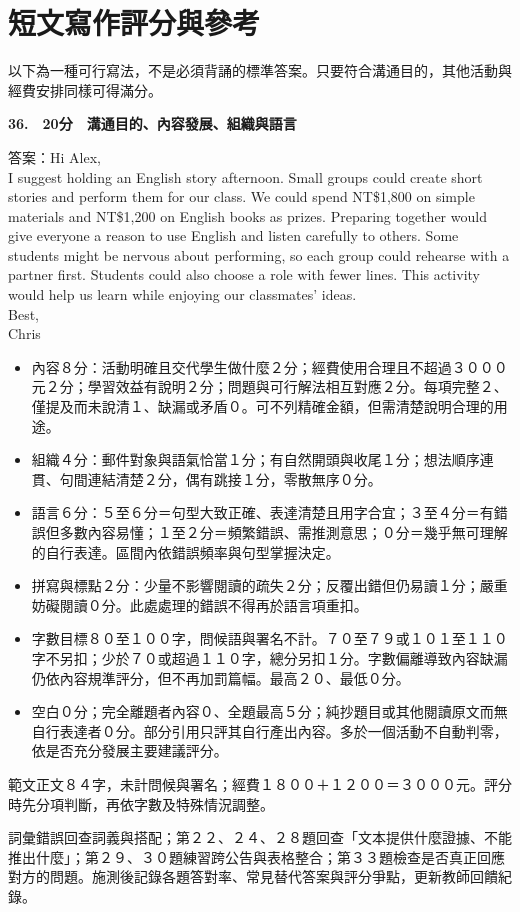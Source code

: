 \documentclass[11pt,a4paper]{article}
\newcommand{\smallheading}[1]{\par\vspace{6pt}{\large\bfseries #1}\par\smallskip}
\begin{document}
\newpage
\section*{短文寫作評分與參考}
以下為一種可行寫法，不是必須背誦的標準答案。只要符合溝通目的，其他活動與經費安排同樣可得滿分。
\par\smallskip
{}\textbf{36.　20分　溝通目的、內容發展、組織與語言}\par
答案：Hi Alex,\\I suggest holding an English story afternoon. Small groups could create short stories and perform them for our class. We could spend NT\$1,800 on simple materials and NT\$1,200 on English books as prizes. Preparing together would give everyone a reason to use English and listen carefully to others. Some students might be nervous about performing, so each group could rehearse with a partner first. Students could also choose a role with fewer lines. This activity would help us learn while enjoying our classmates' ideas.\\Best,\\Chris
\par\smallskip
\begin{itemize}[leftmargin=1.3em,itemsep=2pt,topsep=1pt]
\item 內容８分：活動明確且交代學生做什麼２分；經費使用合理且不超過３０００元２分；學習效益有說明２分；問題與可行解法相互對應２分。每項完整２、僅提及而未說清１、缺漏或矛盾０。可不列精確金額，但需清楚說明合理的用途。
\item 組織４分：郵件對象與語氣恰當１分；有自然開頭與收尾１分；想法順序連貫、句間連結清楚２分，偶有跳接１分，零散無序０分。
\item 語言６分：５至６分＝句型大致正確、表達清楚且用字合宜；３至４分＝有錯誤但多數內容易懂；１至２分＝頻繁錯誤、需推測意思；０分＝幾乎無可理解的自行表達。區間內依錯誤頻率與句型掌握決定。
\item 拼寫與標點２分：少量不影響閱讀的疏失２分；反覆出錯但仍易讀１分；嚴重妨礙閱讀０分。此處處理的錯誤不得再於語言項重扣。
\item 字數目標８０至１００字，問候語與署名不計。７０至７９或１０１至１１０字不另扣；少於７０或超過１１０字，總分另扣１分。字數偏離導致內容缺漏仍依內容規準評分，但不再加罰篇幅。最高２０、最低０分。
\item 空白０分；完全離題者內容０、全題最高５分；純抄題目或其他閱讀原文而無自行表達者０分。部分引用只評其自行產出內容。多於一個活動不自動判零，依是否充分發展主要建議評分。
\end{itemize}
\medskip
範文正文８４字，未計問候與署名；經費１８００＋１２００＝３０００元。評分時先分項判斷，再依字數及特殊情況調整。
\par\smallskip
\smallheading{教學回饋建議}
詞彙錯誤回查詞義與搭配；第２２、２４、２８題回查「文本提供什麼證據、不能推出什麼」；第２９、３０題練習跨公告與表格整合；第３３題檢查是否真正回應對方的問題。施測後記錄各題答對率、常見替代答案與評分爭點，更新教師回饋紀錄。
\par\smallskip
\end{document}
